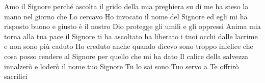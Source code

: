 \beginchorus
Amo il Signore perché ascolta
il grido della mia preghiera
su di me ha steso la mano
nel giorno che Lo cercavo
\endchorus
\beginverse
Ho invocato il nome del Signore
ed egli mi ha risposto
buono e giusto è il nostro Dio
protegge gli umili e gli oppressi
Anima mia torna alla tua pace
il Signore ti ha ascoltato
ha liberato i tuoi occhi dalle lacrime
e non sono più caduto
Ho creduto anche quando dicevo
sono troppo infelice
che cosa posso rendere al Signore
per quello che mi ha dato
Il calice della salvezza innalzerò
e loderò il nome tuo Signore
Tu lo sai sono Tuo servo
a Te offrirò sacrifici
\endverse
\endsong
